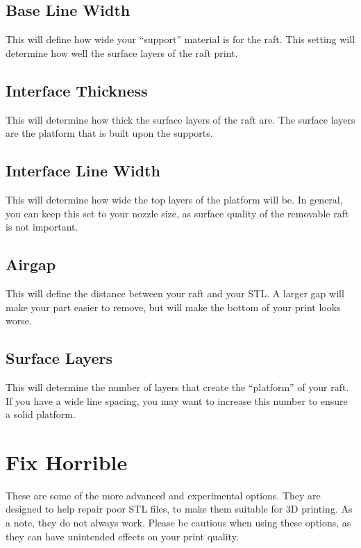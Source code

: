 \subsection{Base Line Width}

This will define how wide your “support” material is for the raft. This setting will determine how well the surface layers of the raft print.

\subsection{Interface Thickness}

This will determine how thick the surface layers of the raft are. The surface layers are the platform that is built upon the supports.

\subsection{Interface Line Width}

This will determine how wide the top layers of the platform will be. In general, you can keep this set to your nozzle size, as surface quality of the removable raft is not important.

\subsection{Airgap}

This will define the distance between your raft and your STL. A larger gap will make your part easier to remove, but will make the bottom of your print looks worse.

\subsection{Surface Layers}

This will determine the number of layers that create the “platform” of your raft. If you have a wide line spacing, you may want to increase this number to ensure a solid platform. 

\section{Fix Horrible}

These are some of the more advanced and experimental options. They are designed to help repair poor STL files, to make them suitable for 3D printing. As a note, they do not always work. Please be cautious when using these options, as they can have unintended effects on your print quality.

